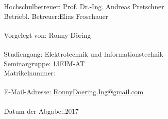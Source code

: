 \begin{spacing}{1.3}
	\begin{tabbing}
	Hochschulbetreuer:\hspace*{2.5cm} \= Prof. Dr.-Ing. Andreas Pretschner\\
	Betriebl. Betreuer:\>Elias Froschauer\\
	\ \\
	Vorgelegt von:\> Ronny Döring\\
	\ \\
	Studiengang:\> Elektrotechnik und Informationstechnik\\
	Seminargruppe:\> 13EIM-AT\\
	Matrikelnummer:\\
	\ \\
	E-Mail-Adresse:\> \href{mailto:RonnyDoering.Ing@gmail.com}{RonnyDoering.Ing@gmail.com}\\
	\ \\
	Datum der Abgabe:.2017 \\
	\end{tabbing}

\end{spacing}


